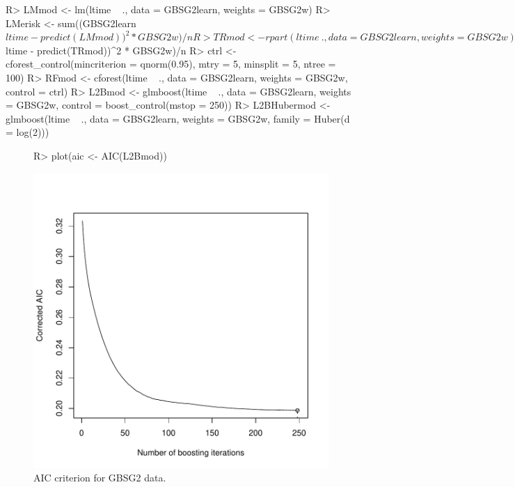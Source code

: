 \documentclass{article}
\newenvironment{Schunk}{}{}
\begin{document}
\begin{Schunk}
\begin{Sinput}
R> LMmod <- lm(ltime ~ ., data = GBSG2learn, weights = GBSG2w)
R> LMerisk <- sum((GBSG2learn$ltime - predict(LMmod))^2 * 
         GBSG2w)/n
R> TRmod <- rpart(ltime ~ ., data = GBSG2learn, weights = GBSG2w)
R> TRerisk <- sum((GBSG2learn$ltime - predict(TRmod))^2 * 
         GBSG2w)/n
R> ctrl <- cforest_control(mincriterion = qnorm(0.95), 
         mtry = 5, minsplit = 5, ntree = 100)
R> RFmod <- cforest(ltime ~ ., data = GBSG2learn, 
         weights = GBSG2w, control = ctrl)
R> L2Bmod <- glmboost(ltime ~ ., data = GBSG2learn, 
         weights = GBSG2w, control = boost_control(mstop = 250))
R> L2BHubermod <- glmboost(ltime ~ ., data = GBSG2learn, 
         weights = GBSG2w, family = Huber(d = log(2)))
\end{Sinput}
\end{Schunk}

\begin{figure}
\begin{center}
\begin{Schunk}
\begin{Sinput}
R> plot(aic <- AIC(L2Bmod))
\end{Sinput}
\end{Schunk}
\includegraphics{SurvivalEnsembles-GBSG2-AIC}
\caption{AIC criterion for GBSG2 data.}
\end{center}
\end{figure}
\end{document}
